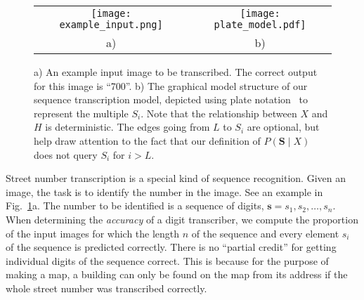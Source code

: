 \documentclass{article} \usepackage{comment}
\begin{document}
\begin{figure}
\centering
\begin{tabular}{cc}
\texttt{[image: example\_input.png]} &\texttt{[image: plate\_model.pdf]} \\
a) & b)\\
\end{tabular}
\iffalse
\begin{subfigure}{.49\textwidth}
\centering
\texttt{[image: example\_input.png]}
\label{fig:example_input}
\end{subfigure}\begin{subfigure}{.49\textwidth}
\centering
\texttt{[image: plate\_model.pdf]}
\label{fig:plate}
\end{subfigure}
\fi
\caption{a) An example input image to be transcribed. The correct output for this image is ``700''. 
b) The graphical model structure of our sequence transcription model, depicted
using plate notation~\citep{Buntine94} to represent the multiple $S_i$. Note that the relationship
between $X$ and $H$ is deterministic. The edges going from $L$ to $S_i$ are optional,
but help draw attention to the fact that our definition of $P(\mathbf{S} \mid X)$ does not
query $S_i$ for $i > L$.}
\label{hacky_fig}
\end{figure}

Street number transcription is a special kind of sequence recognition. Given an image, the task
is to identify the number in the image. See an example in Fig.~\ref{hacky_fig}a. The
number to be identified is a sequence of digits, $\mathbf{s} = s_1, s_2, \dots, s_n$. When determining
the {\em accuracy} of a digit transcriber, we compute the proportion of the input images for
which the length $n$ of the sequence and every element $s_i$ of the sequence is predicted correctly.
There is no ``partial credit'' for getting individual digits of the sequence correct. This is
because for the purpose of making a map, a building can only be found on the map from its address
if the whole street number was transcribed correctly.
\end{document}
